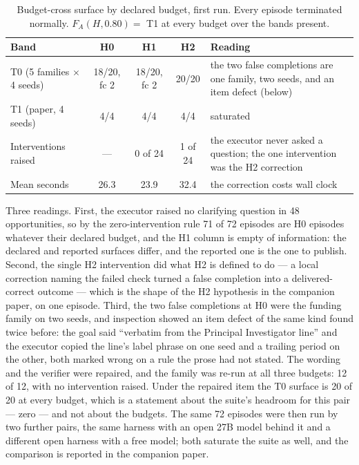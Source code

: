 \documentclass[11pt]{article}
\theoremstyle{definition}
\begin{document}
\begin{table}[H]
\centering\small
\begin{tabularx}{\textwidth}{@{}lcccY@{}}
\toprule
Band & H0 & H1 & H2 & Reading \\
\midrule
T0 (5 families $\times$ 4 seeds) & 18/20, fc 2 & 18/20, fc 2 & 20/20 & the two false completions are one family, two seeds, and an item defect (below) \\
T1 (paper, 4 seeds) & 4/4 & 4/4 & 4/4 & saturated \\
Interventions raised & --- & 0 of 24 & 1 of 24 & the executor never asked a question; the one intervention was the H2 correction \\
Mean seconds & 26.3 & 23.9 & 32.4 & the correction costs wall clock \\
\bottomrule
\end{tabularx}
\caption{Budget-cross surface by declared budget, first run. Every episode terminated normally. $F_A(H, 0.80) = $ T1 at every budget over the bands present.}
\label{tab:budgetcross}
\end{table}

Three readings. First, the executor raised no clarifying question in 48 opportunities, so by the zero-intervention rule 71 of 72 episodes are H0 episodes whatever their declared budget, and the H1 column is empty of information: the declared and reported surfaces differ, and the reported one is the one to publish. Second, the single H2 intervention did what H2 is defined to do --- a local correction naming the failed check turned a false completion into a delivered-correct outcome --- which is the shape of the H2 hypothesis in the companion paper, on one episode. Third, the two false completions at H0 were the funding family on two seeds, and inspection showed an item defect of the same kind found twice before: the goal said ``verbatim from the Principal Investigator line'' and the executor copied the line's label phrase on one seed and a trailing period on the other, both marked wrong on a rule the prose had not stated. The wording and the verifier were repaired, and the family was re-run at all three budgets: 12 of 12, with no intervention raised. Under the repaired item the T0 surface is 20 of 20 at every budget, which is a statement about the suite's headroom for this pair --- zero --- and not about the budgets. The same 72 episodes were then run by two further pairs, the same harness with an open 27B model behind it and a different open harness with a free model; both saturate the suite as well, and the comparison is reported in the companion paper.
\end{document}
